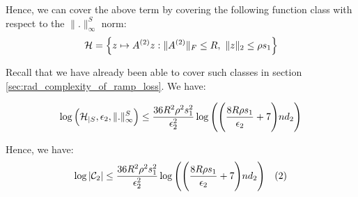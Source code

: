 \noindent Hence, we can cover the above term by covering the following function class with respect to the $\|.\|_\infty^S$ norm:
\begin{align*}
    \mathcal{H} = \Big\{ 
        z \mapsto A^{(2)}z : \|A^{(2)}\|_F \le R, \ \|z\|_2 \le \rho s_1
     \Big\}
\end{align*}

\noindent Recall that we have already been able to cover such classes in section \ref{sec:rad_complexity_of_ramp_loss}. We have:

\begin{align*}
    \log\Big( \mathcal{H}_{|S}, \epsilon_2, \|.\|_\infty^S \Big) \le \frac{36R^2\rho^2s_1^2}{\epsilon_2^2}\log\Bigg( 
        \Bigg( \frac{8R\rho s_1}{\epsilon_2} + 7 \Bigg)nd_2
     \Bigg)
\end{align*}

\noindent Hence, we have:
\begin{align*}
    \log|\mathcal{C}_2| \le \frac{36R^2\rho^2s_1^2}{\epsilon_2^2}\log\Bigg( 
        \Bigg( \frac{8R\rho s_1}{\epsilon_2} + 7 \Bigg)nd_2
     \Bigg) \ \ \ (2)
\end{align*}


